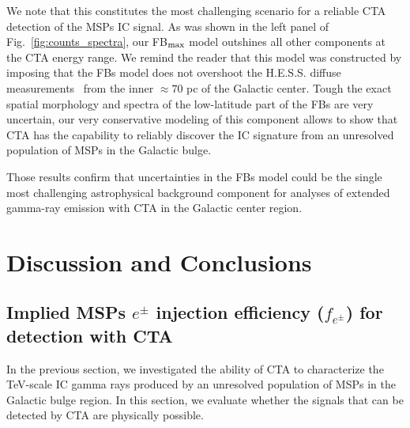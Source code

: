 \documentclass[doublespace,nopageskip]{VTthesis}
\begin{document}
We note that this constitutes the most challenging scenario for a reliable CTA detection of the MSPs IC signal. As was shown in the left panel of Fig.~\ref{fig:counts_spectra}, our FB$_{\rm max}$ model outshines all other components at the CTA energy range. We remind the reader that this model was constructed by imposing that the FBs model does not overshoot the H.E.S.S. diffuse  measurements~\citep{2016Natur.531..476H} from the inner $\approx 70$ pc of the Galactic center. Tough the exact spatial morphology and spectra of the low-latitude part of the FBs are very uncertain, our very conservative modeling of this component allows to show that CTA has the capability to reliably discover the IC signature from an unresolved population of MSPs in the Galactic bulge.

Those results confirm that uncertainties in the FBs model could be the single most challenging astrophysical background component for analyses of extended gamma-ray emission with CTA in the Galactic center region.

\section{Discussion and Conclusions}
\label{sec:discussions_CTA}

\subsection{Implied MSPs $e^\pm$ injection efficiency ($f_{e^\pm}$) for detection with CTA}
\label{sec:efficiency}

In the previous section, we  investigated the ability of CTA to characterize the TeV-scale IC gamma rays produced by an unresolved population of MSPs in the Galactic bulge region. In this section, we evaluate whether the signals that can be detected by CTA are physically possible.
\end{document}
